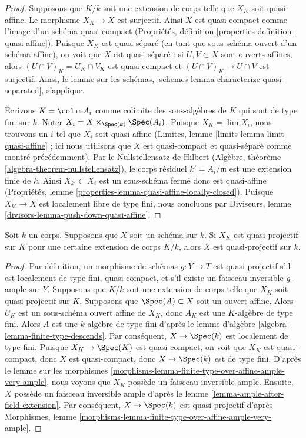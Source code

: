 \begin{proof}
Supposons que $K/k$ soit une extension de corps telle que $X_K$ soit
quasi-affine. Le morphisme $X_K \to X$ est surjectif. Ainsi $X$ est
quasi-compact comme l'image d'un schéma quasi-compact (Propriétés,
définition \ref{properties-definition-quasi-affine}). Puisque $X_K$
est quasi-séparé (en tant que sous-schéma ouvert d'un schéma affine),
on voit que $X$ est quasi-séparé : si $U, V \subset X$ sont
ouverts affines, alors $(U \cap V)_K = U_K \cap V_K$ est quasi-compact
et $(U \cap V)_K \to U \cap V$ est surjectif. Ainsi, le lemme sur les
schémas, \ref{schemes-lemma-characterize-quasi-separated}, s'applique.

\medskip\noindent
Écrivons $K = \colim A_i$ comme colimite des
sous-algèbres de $K$ qui sont de type fini sur $k$. Noter
$X_i = X \times_{\Spec(k)} \Spec(A_i)$. Puisque $X_K = \lim
X_i$, nous trouvons un $i$ tel que $X_i$ soit quasi-affine
(Limites, lemme \ref{limits-lemma-limit-quasi-affine} ; ici
nous utilisons que $X$ est quasi-compact et quasi-séparé
comme montré précédemment). Par le Nullstellensatz de
Hilbert (Algèbre, théorème
\ref{algebra-theorem-nullstellensatz}), le corps résiduel $k' =
A_i/\mathfrak m$ est une extension finie de $k$. Ainsi $X_{k'}
\subset X_i$ est un sous-schéma fermé donc est quasi-affine
(Propriétés, lemme
\ref{properties-lemma-quasi-affine-locally-closed}). Puisque $X_{k'} \to X$ est localement libre
de type fini, nous concluons par Diviseurs, lemme \ref{divisors-lemma-push-down-quasi-affine}.
\end{proof}

\begin{lemma}
\label{lemma-quasi-projective-after-field-extension}
Soit $k$ un corps. Supposons que $X$ soit un schéma
sur $k$. Si $X_K$ est quasi-projectif sur $K$ pour une certaine
extension de corps $K/k$, alors $X$ est quasi-projectif sur $k$.
\end{lemma}

\begin{proof}
Par définition, un morphisme de schémas $g : Y \to T$ est
quasi-projectif s'il est localement de type fini, quasi-compact,
et s'il existe un faisceau inversible $g$-ample sur $Y$.
Supposons que $K/k$ soit une extension de corps telle que $X_K$
soit quasi-projectif sur $K$. Supposons que $\Spec(A) \subset X$
soit un ouvert affine. Alors $U_K$ est un sous-schéma ouvert
affine de $X_K$, donc $A_K$ est une $K$-algèbre de type fini.
Alors $A$ est une $k$-algèbre de type fini d'après le lemme
d'algèbre \ref{algebra-lemma-finite-type-descends}. Par conséquent,
$X \to \Spec(k)$ est localement de type fini. Puisque $X_K \to
\Spec(K)$ est quasi-compact, on voit que $X_K$ est
quasi-compact, donc $X$ est quasi-compact, donc $X \to \Spec(k)$ est
de type fini. D'après le lemme sur les morphismes
\ref{morphisms-lemma-finite-type-over-affine-ample-very-ample}, nous
voyons que $X_K$ possède un faisceau inversible ample. Ensuite, $X$ possède
un faisceau inversible ample d'après le lemme
\ref{lemma-ample-after-field-extension}. Par conséquent, $X \to \Spec(k)$ est
quasi-projectif d'après Morphismes, lemme \ref{morphisms-lemma-finite-type-over-affine-ample-very-ample}.
\end{proof}

